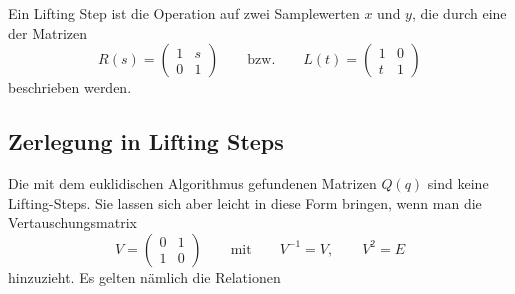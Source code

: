 \begin{definition}
Ein Lifting Step ist die Operation auf zwei Samplewerten $x$ und $y$,
die durch eine der Matrizen
\[
R(s)
=
\begin{pmatrix}
1&s\\
0&1
\end{pmatrix}
\qquad\text{bzw.}\qquad
L(t)
=
\begin{pmatrix}
1&0\\
t&1
\end{pmatrix}
\]
beschrieben werden.
\end{definition}

\subsection{Zerlegung in Lifting Steps}
Die mit dem euklidischen Algorithmus gefundenen Matrizen $Q(q)$ sind
keine Lifting-Steps.
Sie lassen sich aber leicht in diese Form bringen, wenn man die
Vertauschungsmatrix 
\[
V
=
\begin{pmatrix}0&1\\1&0\end{pmatrix}
\qquad\text{mit}\qquad
V^{-1} = V, \qquad V^2=E
\]
hinzuzieht.
Es gelten nämlich die Relationen
